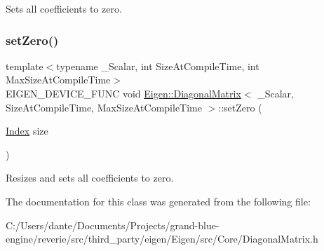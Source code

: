 Sets all coefficients to zero. \mbox{\label{class_eigen_1_1_diagonal_matrix_a9f1a1ca602e5432b6856d3a6783a6d1c}} 
\subsubsection{\texorpdfstring{setZero()}{setZero()}\hspace{0.1cm}{\footnotesize\ttfamily [2/2]}}
{\footnotesize\ttfamily template$<$typename \+\_\+\+Scalar, int Size\+At\+Compile\+Time, int Max\+Size\+At\+Compile\+Time$>$ \\
E\+I\+G\+E\+N\+\_\+\+D\+E\+V\+I\+C\+E\+\_\+\+F\+U\+NC void \mbox{\hyperlink{class_eigen_1_1_diagonal_matrix}{Eigen\+::\+Diagonal\+Matrix}}$<$ \+\_\+\+Scalar, Size\+At\+Compile\+Time, Max\+Size\+At\+Compile\+Time $>$\+::set\+Zero (\begin{DoxyParamCaption}\item[{\mbox{\hyperlink{struct_eigen_1_1_eigen_base_a554f30542cc2316add4b1ea0a492ff02}{Index}}}]{size }\end{DoxyParamCaption})\hspace{0.3cm}{\ttfamily [inline]}}

Resizes and sets all coefficients to zero. 

The documentation for this class was generated from the following file\+:\begin{DoxyCompactItemize}
\item 
C\+:/\+Users/dante/\+Documents/\+Projects/grand-\/blue-\/engine/reverie/src/third\+\_\+party/eigen/\+Eigen/src/\+Core/Diagonal\+Matrix.\+h\end{DoxyCompactItemize}
